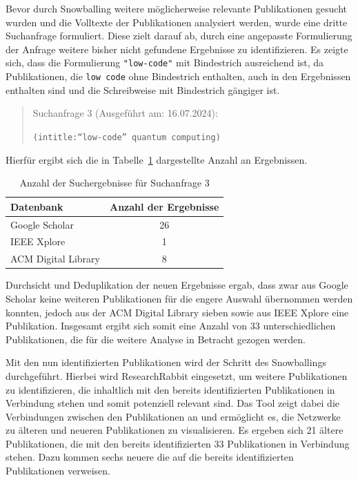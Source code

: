Bevor durch Snowballing weitere möglicherweise relevante Publikationen gesucht wurden und die Volltexte der Publikationen analysiert werden, 
wurde eine dritte Suchanfrage formuliert. Diese zielt darauf ab, durch eine angepasste Formulierung der Anfrage weitere bisher nicht gefundene 
Ergebnisse zu identifizieren. Es zeigte sich, dass die Formulierung \texttt{"low-code"} mit Bindestrich ausreichend ist, da Publikationen, die
\texttt{low code} ohne Bindestrich enthalten, auch in den Ergebnissen enthalten sind und die Schreibweise mit Bindestrich gängiger ist. 

\begin{quote}
    Suchanfrage 3 (Ausgeführt am: 16.07.2024):

    \texttt{(intitle:``low-code'' quantum computing)} 

\end{quote}

Hierfür ergibt sich die in Tabelle~\ref{tab:search_3_results} dargestellte Anzahl an Ergebnissen. 

\begin{table}[h!]
    \centering
    \caption{Anzahl der Suchergebnisse für Suchanfrage 3}
    \label{tab:search_3_results}
    \begin{tabular}{|l|c|}
    \hline
    \textbf{Datenbank} & \textbf{Anzahl der Ergebnisse} \\ \hline
    Google Scholar & 26 \\ \hline
    IEEE Xplore & 1 \\ \hline
    ACM Digital Library & 8 \\ \hline
    \end{tabular}
\end{table}

Durchsicht und Deduplikation der neuen Ergebnisse ergab, dass zwar aus Google Scholar keine weiteren Publikationen für die engere Auswahl übernommen werden konnten, 
jedoch aus der ACM Digital Library sieben sowie aus IEEE Xplore eine Publikation. Insgesamt ergibt sich somit eine Anzahl von 33 
unterschiedlichen Publikationen, die für die weitere Analyse in Betracht gezogen werden. 

Mit den nun identifizierten Publikationen wird der Schritt des Snowballings durchgeführt. Hierbei wird ResearchRabbit eingesetzt, um 
weitere Publikationen zu identifizieren, die inhaltlich mit den bereits identifizierten Publikationen in Verbindung stehen und somit 
potenziell relevant sind. Das Tool zeigt dabei die Verbindungen zwischen den Publikationen an und ermöglicht es, die Netzwerke 
zu älteren und neueren Publikationen zu visualisieren. Es ergeben sich 21 ältere Publikationen, die mit den bereits identifizierten 33 
Publikationen in Verbindung stehen. Dazu kommen sechs neuere die auf die bereits identifizierten Publikationen verweisen. 

